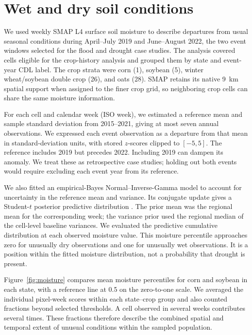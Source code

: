 \section{Wet and dry soil conditions}
\label{sec:moisture}

We used weekly SMAP L4 surface soil moisture to describe departures from
usual seasonal conditions during April--July 2019 and June--August 2022,
the two event windows selected for the flood and drought case studies.
The analysis covered cells eligible for the crop-history analysis and
grouped them by state and event-year CDL label. The crop strata were corn
(1), soybean (5), winter wheat/soybean double crop (26), and oats (28).
SMAP retains its native 9~km spatial support when assigned to the finer
crop grid, so neighboring crop cells can share the same moisture
information.

For each cell and calendar week (ISO week), we estimated a reference mean
and sample standard deviation from 2015--2021, giving at most seven annual
observations. We expressed each event observation as a departure from that
mean in standard-deviation units, with stored $z$-scores clipped to
$[-5,5]$. The reference includes 2019 but precedes 2022. Including 2019
can dampen its anomaly. We treat these as retrospective case studies;
holding out both events would require excluding each event year from its
reference.

We also fitted an empirical-Bayes Normal--Inverse-Gamma model to account
for uncertainty in the reference mean and variance. Its conjugate update
gives a Student-$t$ posterior predictive distribution \citep{murphy2007conjugate}.
The prior mean was the regional mean for the corresponding week; the
variance prior used the regional median of the cell-level baseline
variances. We evaluated the predictive cumulative distribution at each
observed moisture value. This moisture
percentile approaches zero for unusually dry observations and one for
unusually wet observations. It is a position within the fitted moisture
distribution, not a probability that drought is present.

Figure~\ref{fig:moisture} compares mean moisture percentiles for corn and
soybean in each state, with a reference line at 0.5 on the zero-to-one
scale. We averaged the individual pixel-week scores within each
state--crop group and also counted fractions beyond selected thresholds.
A cell observed in several weeks contributes several times. These
fractions therefore describe the combined spatial and temporal extent of
unusual conditions within the sampled population.

